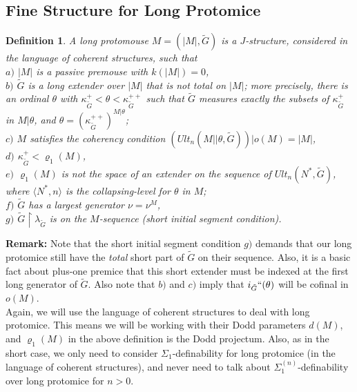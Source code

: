 \documentclass[12pt]{article}
\newtheorem{defn}[thm]{Definition}
\begin{document}
\subsection{Fine Structure for Long Protomice}


\begin{defn} \label{long protomouse}
A long protomouse $M = (| M |, \tilde{G})$ is a $J$-structure, considered in the language of coherent structures, such that\\

$a)$ $| M |$ is a passive premouse with $k( |M|) = 0$,\\

 $b)$ $\tilde{G}$ is a long extender over $|M|$ that is not total on $|M|$; more precisely, there is an ordinal $\theta$ with $\kappa_{\tilde{G}}^+ < \theta < \kappa_{\tilde{G}}^{++}$ such that $\tilde{G}$ measures exactly the subsets of $\kappa_{\tilde{G}}^+$ in $M | \theta$, and $\theta = (\kappa_{\tilde{G}}^{++})^{M| \theta}$;\\
 
 $c)$ $M$ satisfies the coherency condition $(Ult_n ( M || \theta , \tilde{G} ) ) | o(M) = |M|$,\\
 
 $d)$ $\kappa_{\tilde{G}}^+ < \varrho_1 (M)$,\\
 
 $e)$ $\varrho_1 (M)$ is not the space of an extender on the sequence of $Ult_n(N^* , \tilde{G})$, where $\langle N^* , n \rangle$ is the collapsing-level for $\theta$ in $M$;\\
 
 $f)$ $\tilde{G}$ has a largest generator $\nu = \nu^M$,\\
 
 $g)$ $\tilde{G} \restriction \lambda_{\tilde{G}}$ is on the $M$-sequence (short initial segment condition).

\end{defn}

\bigskip


\textbf{Remark:} Note that the short initial segment condition $g)$ demands that our long protomice still have the \textit{total} short part of $\tilde{G}$ on their sequence.  Also, it is a basic fact about plus-one premice that this short extender must be indexed at the first long generator of $\tilde{G}$.  Also note that $b)$ and $c)$ imply that $i_{\tilde{G}}``(\theta)$ will be cofinal in $o(M)$.\\

Again, we will use the language of coherent structures to deal with long protomice.  This means we will be working with their Dodd parameters $d(M)$, and $\varrho_1(M)$ in the above definition is the Dodd projectum. Also, as in the short case, we only need to consider $\Sigma_1$-definability for long protomice (in the language of coherent structures), and never need to talk about $\Sigma_1^{(n)}$-definability over long protomice for $n > 0$.\\
\end{document}
